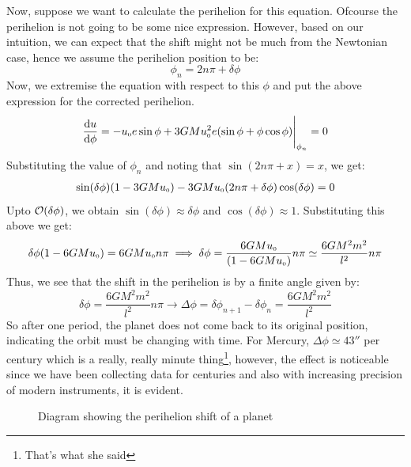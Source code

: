 Now, suppose we want to calculate the perihelion for this equation. Ofcourse the perihelion is not going to be some nice expression. However, based on our intuition, we can expect that the shift might not be much from the Newtonian case, hence we assume the perihelion position to be:
$$\phi_n = 2n\pi + \delta \phi$$
Now, we extremise the equation with respect to this $\phi$ and put the above expression for the corrected perihelion. 
\begin{align*}
    \dv{u}{\phi} = -u_{\text{\tiny 0}}e\sin\phi +3GMu_{\text{\tiny 0}}^2e\qty(\sin\phi + \phi\cos\phi)\Bigg|_{\phi_n}=0
\end{align*}
Substituting the value of $\phi_n$ and noting that $\sin(2n\pi+x) = x$, we get:
\begin{align*}
    \sin(\delta\phi)(1-3GMu_{\text{\tiny 0}}) - 3GMu_{\text{\tiny 0}}(2n\pi+\delta\phi)\cos(\delta\phi) = 0
\end{align*}
Upto $\mathcal O(\delta\phi)$, we obtain $\sin(\delta\phi) \approx \delta \phi$ and $\cos(\delta\phi)\approx 1$. Substituting this above we get:
$$\delta\phi(1-6GMu_{\text{\tiny 0}}) = 6GMu_{\text{\tiny 0}} n\pi \implies \delta\phi =\frac{6GMu_{\text{\tiny 0}}}{(1-6GMu_{\text{\tiny 0}})}n\pi \simeq \frac{6GM^2m^2}{l^2}n\pi$$
Thus, we see that the shift in the perihelion is by a finite angle given by: 
$$\delta\phi = \frac{6GM^2m^2}{l^2}n\pi\longrightarrow \boxed{\Delta\phi = \delta\phi_{n+1} - \delta\phi_n =  \frac{6GM^2m^2}{l^2}}$$
So after one period, the planet does not come back to its original position, indicating the orbit must be changing with time. For Mercury, $\Delta\phi \simeq 43''$ per century which is a really, really minute thing\footnote{ That's what she said }, however, the effect is noticeable since we have been collecting data for centuries and also with increasing precision of modern instruments, it is evident. 
\begin{figure}[H]
    \centering
    
    \caption{Diagram showing the perihelion shift of a planet}
\end{figure}
